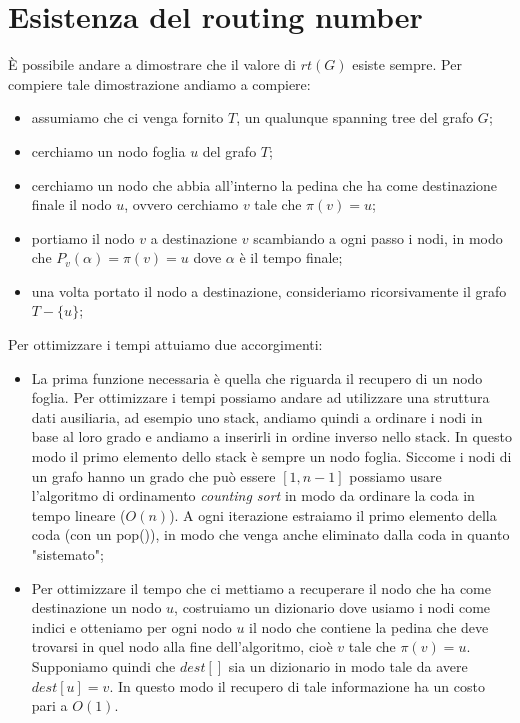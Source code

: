 \chapter{Esistenza del routing number}
\label{routing number}
È possibile andare a dimostrare che il valore di $rt(G)$ esiste sempre. Per compiere tale dimostrazione andiamo a compiere:
\begin{itemize}
    \item assumiamo che ci venga fornito $T$, un qualunque spanning tree del grafo $G$;
    \item cerchiamo un nodo foglia $u$ del grafo $T$;
    \item cerchiamo un nodo che abbia all'interno la pedina che ha come destinazione finale il nodo $u$, ovvero cerchiamo $v$ tale che $\pi(v) = u$;
    \item portiamo il nodo $v$ a destinazione $v$ scambiando a ogni passo i nodi, in modo che $P_v(\alpha) = \pi(v) = u$ dove $\alpha$ è il tempo finale; 
    \item una volta portato il nodo a destinazione, consideriamo ricorsivamente il grafo $T-\{u\}$; 
\end{itemize}

Per ottimizzare i tempi attuiamo due accorgimenti: 

\begin{itemize}
    \item La prima funzione necessaria è quella che riguarda il recupero di un nodo foglia. Per ottimizzare i tempi possiamo andare ad utilizzare una struttura dati ausiliaria, ad esempio uno stack, andiamo quindi a ordinare i nodi in base al loro grado e andiamo a inserirli in ordine inverso nello stack.
    In questo modo il primo elemento dello stack è sempre un nodo foglia. 
    Siccome i nodi di un grafo hanno un grado che può essere $[1,n-1]$ possiamo usare l'algoritmo di ordinamento \textit{counting sort} in modo da ordinare la coda in tempo lineare ($O(n)$). 
    A ogni iterazione estraiamo il primo elemento della coda (con un pop()), in modo che venga anche eliminato dalla coda in quanto "sistemato";
    \item Per ottimizzare il tempo che ci mettiamo a recuperare il nodo che ha come destinazione un nodo $u$, costruiamo un dizionario dove usiamo i nodi come indici e otteniamo per ogni nodo $u$ il nodo che contiene la pedina che deve trovarsi in quel nodo alla fine dell'algoritmo, cioè $v$ tale che $\pi(v)=u$.
    Supponiamo quindi che $dest[]$ sia un dizionario in modo tale da avere $dest[u]=v$.
    In questo modo il recupero di tale informazione ha un costo pari a $O(1)$. 
\end{itemize}

